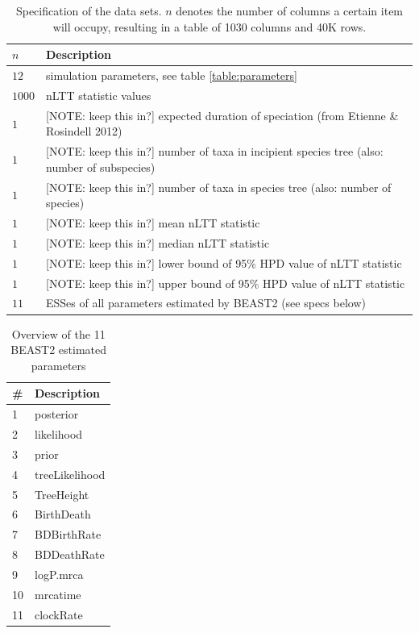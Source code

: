 \documentclass{article}
\begin{document}
\begin{table}
  \centering 
  \begin{tabular}{l l}
    \hline
    $n$ & Description \\
    \hline
    \hline
    $12$   & simulation parameters, see table \ref{table:parameters} \\
    $1000$ & nLTT statistic values \\
    $1$ & [NOTE: keep this in?] expected duration of speciation (from Etienne \& Rosindell 2012) \\
    $1$ & [NOTE: keep this in?] number of taxa in incipient species tree (also: number of subspecies) \\
    $1$ & [NOTE: keep this in?] number of taxa in species tree (also: number of species) \\
    $1$ & [NOTE: keep this in?] mean nLTT statistic \\
    $1$ & [NOTE: keep this in?] median nLTT statistic \\
    $1$ & [NOTE: keep this in?] lower bound of 95\% HPD value of nLTT statistic \\
    $1$ & [NOTE: keep this in?] upper bound of 95\% HPD value of nLTT statistic \\
    $11$ & ESSes of all parameters estimated by BEAST2 (see specs below) \\
    \hline
  \end{tabular}
  \caption{
    Specification of the data sets. $n$ denotes the number
    of columns a certain item will occupy, resulting in a table of 
    1030 columns and 40K rows.
  }
  \label{table:specs}
\end{table}

\begin{table}
  \centering 
  \begin{tabular}{l l}
    \hline
    \# & Description \\
    \hline
    \hline
    1 & posterior \\
    2 & likelihood \\
    3 & prior \\
    4 & treeLikelihood \\
    5 & TreeHeight \\
    6 & BirthDeath \\
    7 & BDBirthRate \\
    8 & BDDeathRate \\
    9 & logP.mrca \\
    10 & mrcatime \\
    11 & clockRate \\
    \hline
  \end{tabular}
  \caption{
    Overview of the 11 BEAST2 estimated parameters
  }
  \label{table:estimated_parameters}
\end{table}
\end{document}

